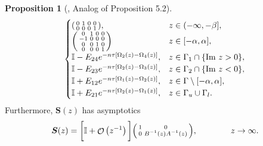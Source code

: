 \documentclass[usenames,dvipsnames]{article}
\theoremstyle{definition}
\newtheorem{prop}{Proposition}[section]
\DeclareMathOperator{\OO}{\mathcal{O}}
\numberwithin{equation}{section}
\numberwithin{figure}{section}
\begin{document}
\begin{prop}[\cite{DHL1}, Analog of Proposition 5.2]
\begin{equation}
\begin{cases}
\begin{psmallmatrix}
                            0 & 1 & 0 & 0\\
                            0 & 0 & 0 & 1
                        \end{psmallmatrix}, & z\in (-\infty,-\beta],\\
                        \begin{psmallmatrix}
                            0 & 1 & 0 & 0\\
                           -1 & 0 & 0 & 0\\
                            0 & 0 & 1 & 0 \\
                            0 & 0 & 0 & 1
                        \end{psmallmatrix} & z\in [-\alpha,\alpha],\\
                        \mathbb{I} - E_{24}e^{-n\tau[\Omega_2(z) - \Omega_4(z)]}, 
                        & z \in \Gamma_1 \cap \{\text{Im } z > 0\},\\
                        \mathbb{I} - E_{23}e^{-n\tau[\Omega_2(z) - \Omega_3(z)]}, 
                        & z \in \Gamma_2 \cap \{\text{Im } z < 0\},\\
                        \mathbb{I} + E_{12}e^{-n\tau[\Omega_1(z) - \Omega_2(z)]},
                        & z\in \Gamma \setminus [-\alpha,\alpha],\\
                        \mathbb{I} + E_{21}e^{-n\tau[\Omega_{2}(z)-\Omega_{1}(z)]}, & z\in \Gamma_{u}\cup\Gamma_{l}.\\
                \end{cases}
            \end{equation}
Furthermore, $\boldsymbol{S}(z)$ has asymptotics
\begin{equation} \label{S-asymptotics}
            \boldsymbol{S}(z) =
            \bigg[\mathbb{I} + \OO\left(z^{-1}\right)\bigg]
            \begin{psmallmatrix}
                1 & 0\\
                0 & B^{-1}(z) A^{-1}(z)
            \end{psmallmatrix},
            \qquad\qquad z \to \infty .
        \end{equation}
    \end{prop}
\end{document}

